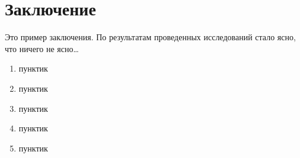 \chapter*{Заключение}
Это пример заключения.
По результатам проведенных исследований стало ясно, что ничего не ясно\ldots

\begin{enumerate}
    \item пунктик
    \item пунктик
    \item пунктик
    \item пунктик
    \item пунктик
\end{enumerate}
